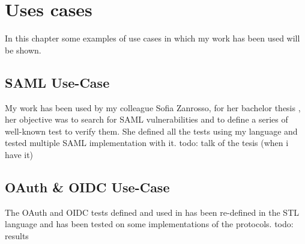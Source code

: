 \chapter{Uses cases}
In this chapter some examples of use cases in which my work has been used will be shown.

\section{SAML Use-Case}
My work has been used by my colleague Sofia Zanrosso, for her bachelor thesis  \cite{sofia_zanrosso}, her objective was to search for \Gls{SAML} vulnerabilities and to define a series of well-known test to verify them.
She defined all the tests using my language and tested multiple \Gls{SAML} implementation with it.
todo: talk of the tesis (when i have it)

\section{OAuth \& OIDC Use-Case}
The \Gls{OAuth} and \Gls{OIDC} tests defined and used in \cite{claudio_grisenti}\cite{wendy_barreto} has been re-defined in the STL language and has been tested on some implementations of the protocols.
todo: results 



